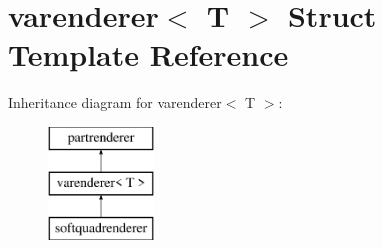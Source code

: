 \hypertarget{structvarenderer}{}\section{varenderer$<$ T $>$ Struct Template Reference}
\label{structvarenderer}
Inheritance diagram for varenderer$<$ T $>$\+:\begin{figure}[H]
\begin{center}
\leavevmode
\includegraphics[height=3.000000cm]{structvarenderer}
\end{center}
\end{figure}
